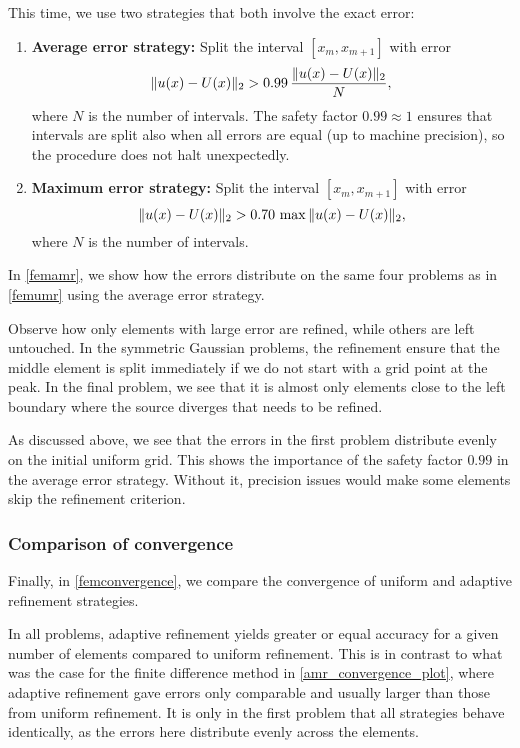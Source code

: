 This time, we use two strategies that both involve the exact error:
\begin{enumerate}
\item \textbf{Average error strategy:} Split the interval $[x_m, x_{m+1}]$ with error 
\begin{equation*}
\Vert u(x)-U(x) \Vert_2 > 0.99 \, \dfrac{\Vert u(x)-U(x) \Vert_2}{N},
\end{equation*}
where $N$ is the number of intervals.
The safety factor $0.99 \approx 1$ ensures that intervals are split also when all errors are equal (up to machine precision), so the procedure does not halt unexpectedly.
\item \textbf{Maximum error strategy:} Split the interval $[x_m, x_{m+1}]$ with error
\begin{equation*}
\Vert u(x)-U(x) \Vert_2 > 0.70 \, \max{\Vert u(x)-U(x) \Vert_2},
\end{equation*}
where $N$ is the number of intervals.
\end{enumerate}

In \cref{femamr}, we show how the errors distribute on the same four problems as in \cref{femumr} using the average error strategy.

Observe how only elements with large error are refined, while others are left untouched.
In the symmetric Gaussian problems, the refinement ensure that the middle element is split immediately if we do not start with a grid point at the peak.
In the final problem, we see that it is almost only elements close to the left boundary where the source diverges that needs to be refined.

As discussed above, we see that the errors in the first problem distribute evenly on the initial uniform grid.
This shows the importance of the safety factor $0.99$ in the average error strategy.
Without it, precision issues would make some elements skip the refinement criterion.

\subsubsection{Comparison of convergence}

Finally, in \cref{femconvergence}, we compare the convergence of uniform and adaptive refinement strategies.

In all problems, adaptive refinement yields greater or equal accuracy for a given number of elements compared to uniform refinement.
This is in contrast to what was the case for the finite difference method in \cref{amr_convergence_plot}, where adaptive refinement gave errors only comparable and usually larger than those from uniform refinement.
It is only in the first problem that all strategies behave identically, as the errors here distribute evenly across the elements.

